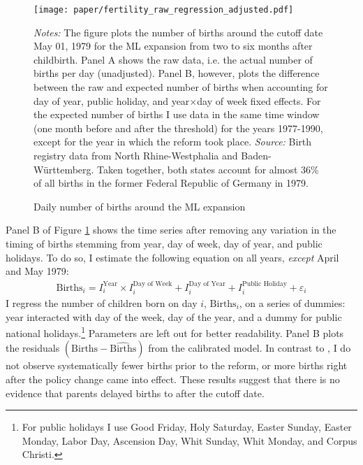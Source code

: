 \begin{figure}[H]\centering
	\texttt{[image: paper/fertility\_raw\_regression\_adjusted.pdf]}
	\scriptsize
	\begin{minipage}{0.9 \linewidth}
		\caption{Daily number of births around the ML expansion}\label{fig_mlch: fertilitydistr}
		\emph{Notes:} The figure plots the number of births around the cutoff date May 01, 1979 for the ML expansion from two to six months after childbirth. Panel A shows the raw data, i.e. the actual number of births per day (unadjusted). Panel B, however, plots the difference between the raw and expected number of births when accounting for day of year, public holiday, and year$\times$day of week fixed effects. For the expected number of births I use data in the same time window (one month before and after the threshold) for the years 1977-1990, except for the year in which the reform took place. \newline\emph{Source:} Birth registry data from North Rhine-Westphalia and Baden-Württemberg. Taken together, both states account for almost 36\% of all births in the former Federal Republic of Germany in 1979.
	\end{minipage}
\end{figure}

Panel B of Figure \ref{fig_mlch: fertilitydistr} shows the time series after removing any variation in the timing of births stemming from year, day of week, day of year, and public holidays. To do so, I estimate the following equation on all years, \emph{except} April and May 1979:
\begin{align}
\text{Births}_i = I^{\text{Year}}_i\times I^{\text{Day of Week}}_i + I^{\text{Day of Year}}_i + I^{\text{Public Holiday}}_i + \varepsilon_i \label{eq: validity_fig}
\end{align}
I regress the number of children born on day $i$, $\text{Births}_i$, on a series of dummies: year interacted with day of the week, day of the year, and a dummy for public national holidays.\footnote{For public holidays I use Good Friday, Holy Saturday, Easter Sunday, Easter Monday, Labor Day, Ascension Day, Whit Sunday, Whit Monday, and Corpus Christi.} Parameters are left out for better readability. Panel B plots the residuals $(\text{Births}-\widehat{\text{Births}})$ from the calibrated model. In contrast to \cite{gans2009born}, I do not observe systematically fewer births prior to the reform, or more births right after the policy change came into effect. These results suggest that there is no evidence that parents delayed births to after the cutoff date.



